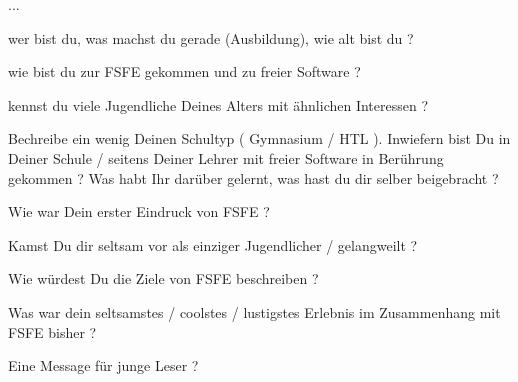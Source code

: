 ...

wer bist du, was machst du gerade (Ausbildung), wie alt bist du ?




wie bist du zur FSFE gekommen und zu freier Software ?



kennst du viele Jugendliche Deines Alters mit ähnlichen Interessen ?



Bechreibe ein wenig Deinen Schultyp ( Gymnasium / HTL ). Inwiefern bist Du in Deiner Schule / seitens Deiner Lehrer 
mit freier Software in Berührung gekommen ? Was habt Ihr darüber gelernt, was hast du dir selber beigebracht ?





Wie war Dein erster Eindruck von FSFE ?



Kamst Du dir seltsam vor als einziger Jugendlicher / gelangweilt ?


Wie würdest Du die Ziele von FSFE beschreiben ?


Was war dein seltsamstes / coolstes / lustigstes Erlebnis im Zusammenhang mit FSFE bisher ?


Eine Message für junge Leser ?



